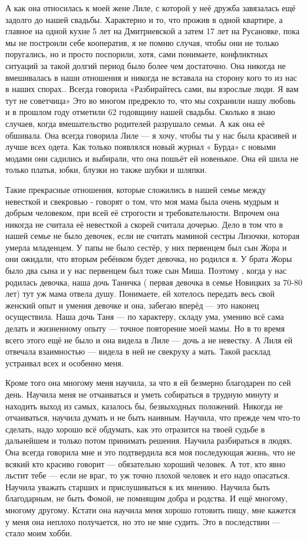 А как она относилась к моей жене Лиле, с которой у неё дружба завязалась ещё
задолго до нашей свадьбы. Характерно и то, что прожив в одной квартире, а
главное  на одной кухне 5 лет на Дмитриевской а затем 17 лет на Русановке, пока
мы не построили себе кооператив, я не помню случая, чтобы они не только
поругались, но и  просто поспорили, хотя, сами понимаете, конфликтных ситуаций
за такой долгий период было более чем  достаточно. Она  никогда не вмешивалась
в наши отношения и никогда не вставала на сторону кого то из нас в наших
спорах..  Всегда говорила «Разбирайтесь сами,  вы взрослые люди. Я вам тут не
советчица»  Это во многом предрекло то, что мы сохранили нашу любовь и в
прошлом году отметили 62 годовщину нашей свадьбы. Сколько я знаю случаев, когда
вмешательство  родителей  разрушало семьи.  А как она её обшивала. Она всегда
говорила Лиле — я хочу, чтобы ты у нас была красивей и лучше  всех одета. Как
только появлялся новый журнал « Бурда» с новыми модами они садились и выбирали,
что она пошьёт  ей новенькое.  Она ей шила не только платья, юбки, блузки  но
также  шубки и шляпки.  

Такие прекрасные отношения, которые сложились в нашей
семье   между невесткой и свекровью  - говорят о том, что моя мама  была  очень
мудрым и добрым человеком, при всей её строгости и требовательности. Впрочем
она никогда не считала её невесткой а скорей считала дочерью. Дело в том что в
нашей семье не было девочек, если не считать маминой сестры Лизочки, которая
умерла младенцем. У папы не было сестёр, у них первенцем  был сын  Жора и они
ожидали, что   вторым ребёнком  будет  девочка, но родился я. У брата Жоры было
два сына и у нас первенцем был  тоже сын Миша. Поэтому , когда у нас  родилась
девочка, наша дочь Таничка ( первая девочка  в семье Новицких  за  70-80 лет)
тут уж мама отвела душу. Понимаете, ей хотелось передать весь свой женский опыт
и умения  девочке  и она, забегаю вперёд — это наконец осуществила. Наша дочь
Таня — по характеру, складу ума,  умению всё сама делать и  жизненному опыту —
точное повторение моей мамы. Но в то время всего этого ещё  не было и она
видела в Лиле — дочь а не невестку. А Лиля ей отвечала взаимностью — видела в
ней не свекруху а мать.  Такой расклад устраивал всех и особенно меня.

Кроме того она многому меня научила, за что я ей безмерно благодарен по сей
день.  Научила меня не отчаиваться и уметь собираться в трудную минуту и
находить выход из самых, казалось бы, безвыходных положений. Никогда не
отчаиваться, научила думать и не быть наивным. Научила, что прежде  чем что-то
сделать, надо хорошо всё обдумать, как это отразится на  твоей судьбе в
дальнейшем и только потом принимать решения.  Научила разбираться в людях. Она
всегда говорила мне и это подтвердила вся моя последующая  жизнь, что не всякий
кто красиво говорит — обязательно хороший человек. А тот, кто явно льстит тебе
—  если не враг, то уж   точно плохой человек и его надо опасаться. Научила
уважать старших и прислушиваться к их мнению. Научила быть благодарным, не быть
Фомой, не помнящим  добра и родства.  И ещё многому, многому другому. Кстати
она научила меня  хорошо готовить пищу,   мне кажется у меня она неплохо
получается, но это не мне судить. Это в последствии  — стало моим хобби.

